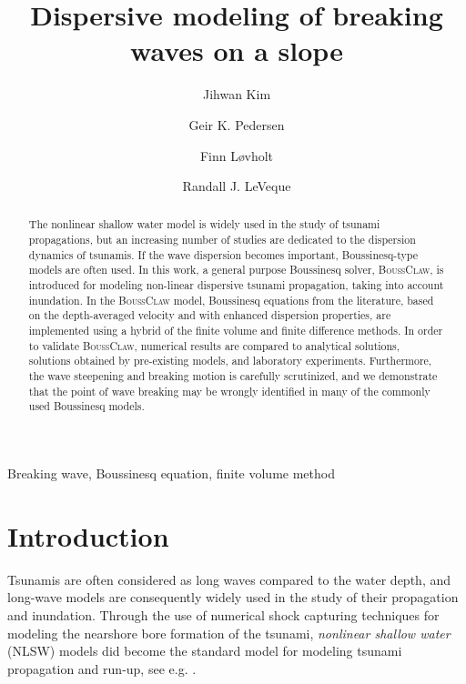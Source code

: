 \documentclass[review]{elsarticle}
\newcommand{\BoussClaw}{\textsc{BoussClaw} }
\newcommand{\BoussClawt}{\textsc{BoussClaw}}
\begin{document}
\begin{frontmatter}

\title{Dispersive modeling of breaking waves  on a slope}

\author[1]{Jihwan Kim}
\author[1]{Geir K. Pedersen}
\author[1,2]{Finn L{\o}vholt}
\author[3]{Randall J. LeVeque}

\address[1]{University of Oslo, Department of Mathematics, 
Oslo, Norway}
\address[2]{Norwegian Geotechnical Institute,
Oslo, Norway}
\address[3]{University of Washington, Department of Applied Mathematics, Seattle, USA}

\begin{abstract}

The nonlinear shallow water model is widely used
in the study of tsunami propagations,
but an increasing number of studies 
are dedicated to the dispersion dynamics of tsunamis.
If the wave dispersion becomes important,
Boussinesq-type models are often used. 
In this work, a general purpose Boussinesq solver, 
\BoussClawt, is introduced
for modeling non-linear dispersive tsunami propagation, 
taking into account inundation. 
In the \BoussClaw model,
Boussinesq equations from the literature, 
based on the depth-averaged velocity 
and with enhanced dispersion properties, 
are implemented using a hybrid of the finite volume
and finite difference methods.
In order to validate \BoussClawt, 
numerical results are compared 
to  analytical solutions, solutions obtained by pre-existing models, and laboratory experiments. 
Furthermore, the  wave steepening and breaking motion
is carefully scrutinized, 
and we demonstrate that the point of wave breaking
may be wrongly identified  in many of the commonly used Boussinesq models. 

\end{abstract}

\begin{keyword}
Breaking wave, Boussinesq equation, finite volume method
\end{keyword}

\end{frontmatter}

\linenumbers

\section{Introduction}

Tsunamis are often considered as long waves compared to the water depth, and 
long-wave models are consequently widely used in the study of their propagation and inundation.
Through the use of numerical shock capturing techniques for modeling
the nearshore bore formation of the tsunami, {\em nonlinear shallow water} (NLSW) models
did become the standard model for modeling tsunami propagation and run-up, see e.g. 
\citep{titov1995modeling,Imamura1996b,Harig2008,BergerGeorgeLeVequeMandli11}.
\end{document}
